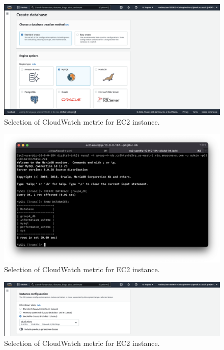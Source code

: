 \begin{figure}[!htbp]
    \centering
    \includegraphics[width=\textwidth]{resources/rds/rds-create-engine.png}
    \caption{Selection of CloudWatch metric for EC2 instance.}
    \label{fig:rds-engine}
\end{figure}

\begin{figure}[!htbp]
    \centering
    \includegraphics[width=\textwidth]{resources/rds/rds-database-creation.png}
    \caption{Selection of CloudWatch metric for EC2 instance.}
    \label{fig:rds-db-create}
\end{figure}

\begin{figure}[!htbp]
    \centering
    \includegraphics[width=\textwidth]{resources/rds/rds-instance-config.png}
    \caption{Selection of CloudWatch metric for EC2 instance.}
    \label{fig:rds-instance-conf}
\end{figure}

